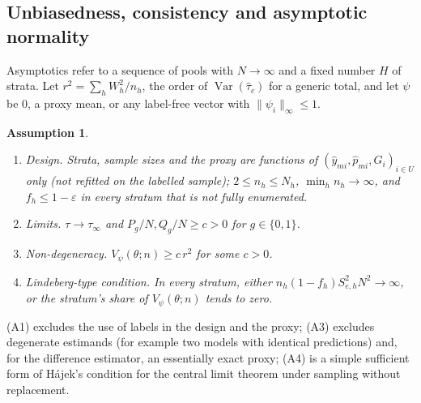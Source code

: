 \documentclass[pdflatex,sn-mathphys-num,iicol]{sn-jnl}
\theoremstyle{thmstyleone}
\theoremstyle{thmstyletwo}
\newtheorem{assumption}{Assumption}
\theoremstyle{thmstylethree}
\begin{document}
\subsection{Unbiasedness, consistency and asymptotic normality}\label{sec:theory-asym}

Asymptotics refer to a sequence of pools with $N\to\infty$ and a fixed number $H$ of strata. Let
$r^2=\sum_hW_h^2/n_h$, the order of $\operatorname{Var}(\hat\tau_c)$ for a generic total, and let $\psi$ be $0$,
a proxy mean, or any label-free vector with $\|\psi_i\|_\infty\le1$.

\begin{assumption}\label{prop:assumptions}
\begin{enumerate}
\item[(A1)] \emph{Design.} Strata, sample sizes and the proxy are functions of
$(\hat y_{mi},\hat p_{mi},G_i)_{i\in U}$ only (not refitted on the labelled sample); $2\le n_h\le N_h$,
$\min_hn_h\to\infty$, and $f_h\le 1-\varepsilon$ in every stratum that is not fully enumerated.
\item[(A2)] \emph{Limits.} $\tau\to\tau_\infty$ and $P_g/N,Q_g/N\ge c>0$ for $g\in\{0,1\}$.
\item[(A3)] \emph{Non-degeneracy.} $V_\psi(\theta;n)\ge c\,r^2$ for some $c>0$.
\item[(A4)] \emph{Lindeberg-type condition.} In every stratum, either
$n_h(1-f_h)S^2_{e,h}N^2\to\infty$, or the stratum's share of $V_\psi(\theta;n)$ tends to zero.
\end{enumerate}
\end{assumption}

(A1) excludes the use of labels in the design and the proxy; (A3) excludes degenerate estimands (for example two models with
identical predictions) and, for the difference estimator, an essentially exact proxy; (A4) is a simple sufficient form of
H\'ajek's \cite{hajek1960} condition for the central limit theorem under sampling without replacement.
\end{document}
